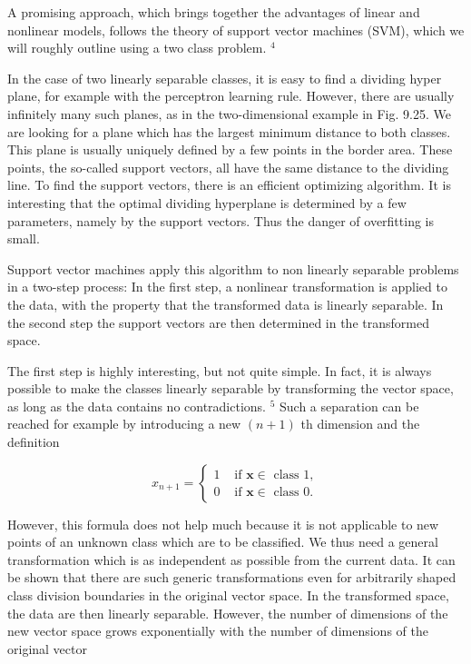 \documentclass[10pt]{article}
\begin{document}
A promising approach, which brings together the advantages of linear and nonlinear models, follows the theory of support vector machines (SVM), which we will roughly outline using a two class problem. ${ }^{4}$

In the case of two linearly separable classes, it is easy to find a dividing hyper plane, for example with the perceptron learning rule. However, there are usually infinitely many such planes, as in the two-dimensional example in Fig. 9.25. We are looking for a plane which has the largest minimum distance to both classes. This plane is usually uniquely defined by a few points in the border area. These points, the so-called support vectors, all have the same distance to the dividing line. To find the support vectors, there is an efficient optimizing algorithm. It is interesting that the optimal dividing hyperplane is determined by a few parameters, namely by the support vectors. Thus the danger of overfitting is small.

Support vector machines apply this algorithm to non linearly separable problems in a two-step process: In the first step, a nonlinear transformation is applied to the data, with the property that the transformed data is linearly separable. In the second step the support vectors are then determined in the transformed space.

The first step is highly interesting, but not quite simple. In fact, it is always possible to make the classes linearly separable by transforming the vector space, as long as the data contains no contradictions. ${ }^{5}$ Such a separation can be reached for example by introducing a new $(n+1)$ th dimension and the definition

$$
x_{n+1}= \begin{cases}1 & \text { if } \boldsymbol{x} \in \text { class } 1, \\ 0 & \text { if } \boldsymbol{x} \in \text { class } 0 .\end{cases}
$$

However, this formula does not help much because it is not applicable to new points of an unknown class which are to be classified. We thus need a general transformation which is as independent as possible from the current data. It can be shown that there are such generic transformations even for arbitrarily shaped class division boundaries in the original vector space. In the transformed space, the data are then linearly separable. However, the number of dimensions of the new vector space grows exponentially with the number of dimensions of the original vector
\end{document}

